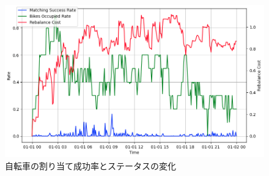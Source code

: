           \begin{figure}[htbp]
            \centering
            \includegraphics[scale=0.25]
            {figures/dispatchedResultFor1Day.png}
            \caption{自転車の割り当て成功率とステータスの変化}
            \label{fig:自転車の割り当て成功率とステータスの変化}
          \end{figure}

